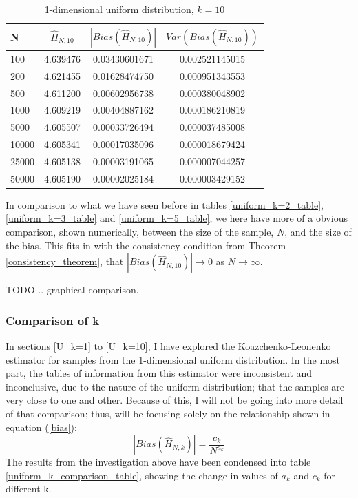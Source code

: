\documentclass{article}
\begin{document}
\begin{table}
\caption{1-dimensional uniform distribution, $k=10$} \label{uniform_k=10_table}
\begin{center}
\begin{tabular}{| l | c c c|} 
\toprule
N & $\hat{H}_{N, 10}$ & $|Bias(\hat{H}_{N, 10})|$ & $Var(Bias(\hat{H}_{N, 10}))$ \\
\midrule[1pt]
100     & 4.639476     & 0.03430601671     & 0.002521145015  \\
200     & 4.621455     & 0.01628474750     & 0.000951343553  \\
500     & 4.611200     & 0.00602956738     & 0.000380048902  \\
1000    & 4.609219     & 0.00404887162     & 0.000186210819  \\
5000    & 4.605507     & 0.00033726494     & 0.000037485008  \\
10000   & 4.605341     & 0.00017035096     & 0.000018679424  \\
25000   & 4.605138     & 0.00003191065     & 0.000007044257  \\
50000   & 4.605190     & 0.00002025184     & 0.000003429152  \\
\hline
\end{tabular}
\end{center}
\end{table}

In comparison to what we have seen before in tables \ref{uniform_k=2_table}, \ref{uniform_k=3_table} and \ref{uniform_k=5_table}, we here have more of a obvious comparison, shown numerically, between the size of the sample, $N$, and the size of the bias. This fits in with the consistency condition from Theorem \ref{consistency_theorem}, that $|Bias(\hat{H}_{N, 10})| \to 0$ as $N \to \infty$. 

TODO ..  graphical comparison.


\subsubsection{Comparison of k} \label{U_compare_k}
In sections \ref{U_k=1} to \ref{U_k=10}, I have explored the Koazchenko-Leonenko estimator for samples from the 1-dimensional uniform distribution. In the most part, the tables of information from this estimator were inconsistent and inconclusive, due to the nature of the uniform distribution; that the samples are very close to one and other. Because of this, I will not be going into more detail of that comparison; thus, will be focusing solely on the relationship shown in equation (\ref{bias});
\begin{equation}
|Bias(\hat{H}_{N, k})| = \frac{c_{k}}{N^{a_{k}}} \nonumber
\end{equation}
The results from the investigation above have been condensed into table \ref{uniform_k_comparison_table}, showing the change in values of $a_{k}$ and $c_{k}$ for different {k}.
\end{document}
